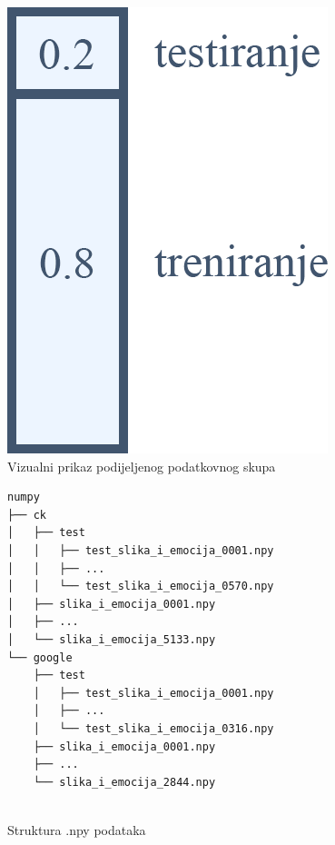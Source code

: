 \documentclass[times, utf8, zavrsni,numeric,pstricks]{fer}
\begin{document}
\begin{figure}[H]
	\centering
	\includegraphics[width=\linewidth, height=0.3\paperheight, keepaspectratio]{splitset.png}
	\caption{Vizualni prikaz podijeljenog podatkovnog skupa}
	\label{pic:dataset_split_percentages}
\end{figure}

\begin{figure}[H]
\centering
\begin{Verbatim}[fontsize=\small]
numpy
├── ck
│   ├── test
│   │	├── test_slika_i_emocija_0001.npy
│   │	├── ...
│   │	└── test_slika_i_emocija_0570.npy
│   ├── slika_i_emocija_0001.npy
│   ├── ...
│   └── slika_i_emocija_5133.npy
└── google
    ├── test
    │	├── test_slika_i_emocija_0001.npy
	│	├── ...
	│	└── test_slika_i_emocija_0316.npy
    ├── slika_i_emocija_0001.npy
    ├── ...
    └── slika_i_emocija_2844.npy
    

\end{Verbatim}
\caption{Struktura .npy podataka}
\label{pic:npy_structure}
\end{figure}
\end{document}
